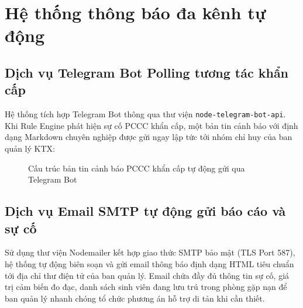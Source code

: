 \section{Hệ thống thông báo đa kênh tự động}
\label{sec:thong_bao_da_kanh}

\subsection{Dịch vụ Telegram Bot Polling tương tác khẩn cấp}
Hệ thống tích hợp Telegram Bot thông qua thư viện \texttt{node-telegram-bot-api}. Khi Rule Engine phát hiện sự cố PCCC khẩn cấp, một bản tin cảnh báo với định dạng Markdown chuyên nghiệp được gửi ngay lập tức tới nhóm chỉ huy của ban quản lý KTX:

\begin{figure}[H]
\centering
{}
\caption{Cấu trúc bản tin cảnh báo PCCC khẩn cấp tự động gửi qua Telegram Bot}
\label{fig:telegram_alert_sample}
\end{figure}

\subsection{Dịch vụ Email SMTP tự động gửi báo cáo và sự cố}
Sử dụng thư viện Nodemailer kết hợp giao thức SMTP bảo mật (TLS Port 587), hệ thống tự động biên soạn và gửi email thông báo định dạng HTML tiêu chuẩn tới địa chỉ thư điện tử của ban quản lý. Email chứa đầy đủ thông tin sự cố, giá trị cảm biến đo đạc, danh sách sinh viên đang lưu trú trong phòng gặp nạn để ban quản lý nhanh chóng tổ chức phương án hỗ trợ di tản khi cần thiết.

\newpage
